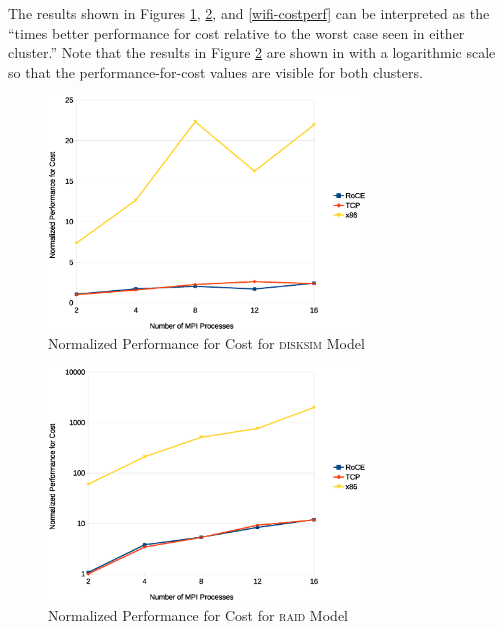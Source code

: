 \documentclass[11pt]{book}
\begin{document}
The results shown in Figures \ref{disksim-costperf}, \ref{raid-costperf}, and
\ref{wifi-costperf} can be interpreted as the ``times better performance for cost relative
to the worst case seen in either cluster.''  Note that the results in Figure
\ref{raid-costperf} are shown in with a logarithmic scale so that the performance-for-cost
values are visible for both clusters.

\begin{figure}
\centering
\includegraphics[width=0.75\textwidth]{disksim_costperf}
\caption{Normalized Performance for Cost for \textsc{disksim}
  Model}\label{disksim-costperf} 
\end{figure}

\begin{figure}
\centering
\includegraphics[width=0.75\textwidth]{raid_costperf}
\caption{Normalized Performance for Cost for \textsc{raid} Model}\label{raid-costperf} 
\end{figure}
\end{document}
